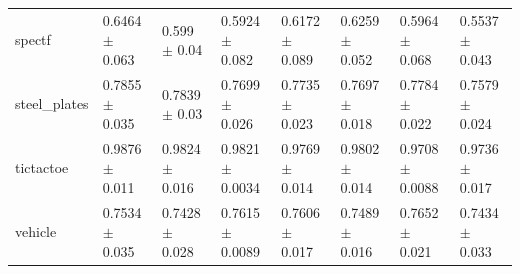 \begin{tabular}{llllllll}
spectf & 0.6464 $\pm$ 0.063 & 0.599 $\pm$ 0.04 & 0.5924 $\pm$ 0.082 & 0.6172 $\pm$ 0.089 & 0.6259 $\pm$ 0.052 & 0.5964 $\pm$ 0.068 & 0.5537 $\pm$ 0.043 \\
steel\_plates & 0.7855 $\pm$ 0.035 & 0.7839 $\pm$ 0.03 & 0.7699 $\pm$ 0.026 & 0.7735 $\pm$ 0.023 & 0.7697 $\pm$ 0.018 & 0.7784 $\pm$ 0.022 & 0.7579 $\pm$ 0.024 \\
tictactoe & 0.9876 $\pm$ 0.011 & 0.9824 $\pm$ 0.016 & 0.9821 $\pm$ 0.0034 & 0.9769 $\pm$ 0.014 & 0.9802 $\pm$ 0.014 & 0.9708 $\pm$ 0.0088 & 0.9736 $\pm$ 0.017 \\
vehicle & 0.7534 $\pm$ 0.035 & 0.7428 $\pm$ 0.028 & 0.7615 $\pm$ 0.0089 & 0.7606 $\pm$ 0.017 & 0.7489 $\pm$ 0.016 & 0.7652 $\pm$ 0.021 & 0.7434 $\pm$ 0.033 \\
\bottomrule
\end{tabular}
